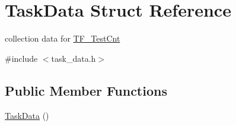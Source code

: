 \hypertarget{structTaskData}{
\section{TaskData Struct Reference}
\label{structTaskData}
}


collection data for \hyperlink{classTF__TestCnt}{TF\_\-TestCnt}  


{\ttfamily \#include $<$task\_\-data.h$>$}\subsection*{Public Member Functions}
\begin{DoxyCompactItemize}
\item 
\hyperlink{structTaskData_a527fe3ca19e5dc328a58a8784ff0607d}{TaskData} ()
\end{DoxyCompactItemize}
